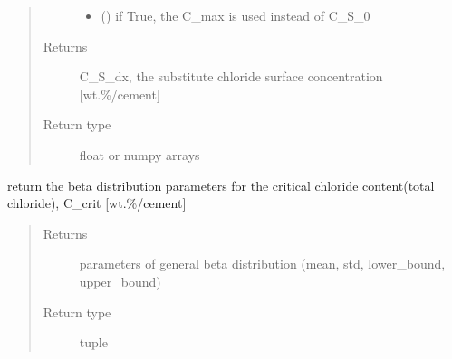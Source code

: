\documentclass[letterpaper,10pt,english]{sphinxmanual}
\begin{document}
\begin{fulllineitems}
\begin{quote}
\begin{description}
\begin{itemize}
\item {} 
\sphinxAtStartPar
{} () \textendash{} if True, the C\_max is used instead of C\_S\_0

\end{itemize}

\item[{Returns}] \leavevmode
\sphinxAtStartPar
C\_S\_dx, the substitute chloride surface concentration {[}wt.\sphinxhyphen{}\%/cement{]}

\item[{Return type}] \leavevmode
\sphinxAtStartPar
float or numpy arrays

\end{description}\end{quote}

\end{fulllineitems}


\begin{fulllineitems}
\label{\detokenize{chloride:chloride.C_crit_param}}
\sphinxAtStartPar
return the beta distribution parameters for the critical chloride content(total chloride), C\_crit {[}wt.\sphinxhyphen{}\%/cement{]}
\begin{quote}\begin{description}
\item[{Returns}] \leavevmode
\sphinxAtStartPar
parameters of general beta distribution (mean, std, lower\_bound, upper\_bound)

\item[{Return type}] \leavevmode
\sphinxAtStartPar
tuple

\end{description}\end{quote}

\end{fulllineitems}

\end{document}
